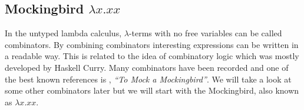 \begin{example}
\begin{comment}
\begin{remark}
    There is a lot going on the the previous example, but crucially it should be observed that it is in fact the \emph{inversion lemmas} that allow us to make choices of which rules to use. So a type-checking algorithm would have to make choices based on what the inversion lemmas say. We also introduced equalities of types which was brushed over. In general, type equalities are only generated by reflexivity so in a way our equations were lifted to equality of syntax. This gave us a classical equality problem. Since all our syntax are trees, we can easily decide their equality. [[CAN YOU???!!]]
\end{remark}
\end{comment}

%

\subsection{Mockingbird $\lambda x . x x$} %

In the untyped lambda calculus, $\lambda$-terms with no free variables can be called combinators. By combining combinators interesting expressions can be written in a readable way. This is related to the idea of combinatory logic which was mostly developed by Haskell Curry. Many combinators have been recorded and one of the best known references is \cite{smullyan2012mock}, \emph{``To Mock a Mockingbird''}. We will take a look at some other combinators later but we will start with the Mockingbird, also known as $\lambda x . x x$.


\end{example}
